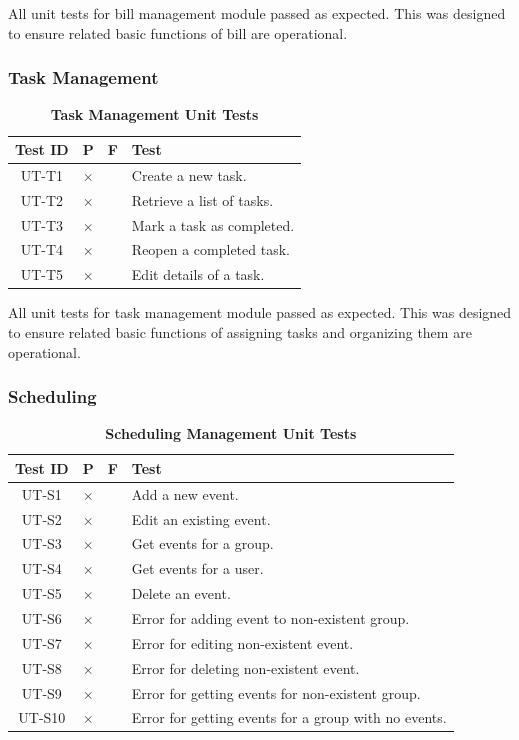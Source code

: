 \documentclass[12pt, titlepage]{article}
\begin{document}
All unit tests for bill management module passed as expected. This was designed to ensure related basic functions of bill are operational. 

\subsubsection{Task Management}

\begin{table}[H]
\centering
\begin{tabular}{|c|c|c|p{5cm}|}
\hline
Test ID & P & F & Test\\
\hline 
UT-T1 & $\times$ & & Create a new task.\\
\hline 
UT-T2 & $\times$ & & Retrieve a list of tasks.\\
\hline 
UT-T3 & $\times$ & & Mark a task as completed.\\
\hline 
UT-T4 & $\times$ & & Reopen a completed task.\\
\hline 
UT-T5 & $\times$ & & Edit details of a task.\\
\hline
\end{tabular}
\caption{\bf Task Management Unit Tests}
\end{table}

All unit tests for task management module passed as expected. This was designed to ensure related basic functions of assigning tasks and organizing them are operational.

\subsubsection{Scheduling}

\begin{table}[H]
\centering
\begin{tabular}{|c|c|c|p{5cm}|}
\hline
Test ID & P & F & Test\\
\hline 
UT-S1 & $\times$ & & Add a new event.\\
\hline 
UT-S2 & $\times$ & & Edit an existing event.\\
\hline 
UT-S3 & $\times$ & & Get events for a group.\\
\hline 
UT-S4 & $\times$ & & Get events for a user.\\
\hline 
UT-S5 & $\times$ & & Delete an event.\\
\hline 
UT-S6 & $\times$ & & Error for adding event to non-existent group.\\
UT-S7 & $\times$ & & Error for editing non-existent event.\\
\hline 
UT-S8 & $\times$ & & Error for deleting non-existent event.\\
\hline 
UT-S9 & $\times$ & & Error for getting events for non-existent group.\\
\hline 
UT-S10 & $\times$ & & Error for getting events for a group with no events.\\
\hline
\end{tabular}
\caption{\bf Scheduling Management Unit Tests}
\end{table}
\end{document}
